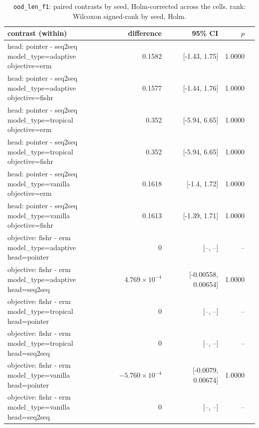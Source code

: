 \documentclass[10pt]{article}
\begin{document}
{\small
\begin{longtable}{lrrrl}
\caption{\texttt{ood\_len\_f1}: paired contrasts by seed, Holm-corrected across the cells. rank: Wilcoxon signed-rank by seed, Holm.}\label{tab:paired-ood_len_f1}\\
\toprule
contrast (within) & difference & 95\% CI & $p$ & \\
\midrule
\endhead
\makecell[l]{head: pointer - seq2seq\\\footnotesize model\_type=adaptive objective=erm } & 0.1582 & [-1.43, 1.75] & 1.0000 & \\
\makecell[l]{head: pointer - seq2seq\\\footnotesize model\_type=adaptive objective=fishr } & 0.1577 & [-1.44, 1.76] & 1.0000 & \\
\makecell[l]{head: pointer - seq2seq\\\footnotesize model\_type=tropical objective=erm } & 0.352 & [-5.94, 6.65] & 1.0000 & \\
\makecell[l]{head: pointer - seq2seq\\\footnotesize model\_type=tropical objective=fishr } & 0.352 & [-5.94, 6.65] & 1.0000 & \\
\makecell[l]{head: pointer - seq2seq\\\footnotesize model\_type=vanilla objective=erm } & 0.1618 & [-1.4, 1.72] & 1.0000 & \\
\makecell[l]{head: pointer - seq2seq\\\footnotesize model\_type=vanilla objective=fishr } & 0.1613 & [-1.39, 1.71] & 1.0000 & \\
\makecell[l]{objective: fishr - erm\\\footnotesize model\_type=adaptive head=pointer } & 0 & [--, --] & -- & \\
\makecell[l]{objective: fishr - erm\\\footnotesize model\_type=adaptive head=seq2seq } & $4.769\times10^{-4}$ & [-0.00558, 0.00654] & 1.0000 & \\
\makecell[l]{objective: fishr - erm\\\footnotesize model\_type=tropical head=pointer } & 0 & [--, --] & -- & \\
\makecell[l]{objective: fishr - erm\\\footnotesize model\_type=tropical head=seq2seq } & 0 & [--, --] & -- & \\
\makecell[l]{objective: fishr - erm\\\footnotesize model\_type=vanilla head=pointer } & $-5.760\times10^{-4}$ & [-0.0079, 0.00674] & 1.0000 & \\
\makecell[l]{objective: fishr - erm\\\footnotesize model\_type=vanilla head=seq2seq } & 0 & [--, --] & -- & \\
\bottomrule
\end{longtable}
}
\end{document}
